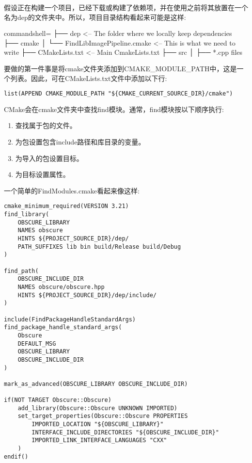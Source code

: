 假设正在构建一个项目，已经下载或构建了依赖项，并在使用之前将其放置在一个名为dep的文件夹中。所以，项目目录结构看起来可能是这样:

\begin{tcblisting}{commandshell={}}
├── dep <-- The folder where we locally keep dependencies
├── cmake
│     └── FindLibImagePipeline.cmake <-- This is what we need to write
├── CMakeLists.txt <-- Main CmakeLists.txt
├── src
│     ├── *.cpp files
\end{tcblisting}

要做的第一件事是将cmake文件夹添加到CMAKE\_MODULE\_PATH中，这是一个列表。因此，可在CMakeLists.txt文件中添加以下行:

\begin{lstlisting}[style=styleCMake]
list(APPEND CMAKE_MODULE_PATH "${CMAKE_CURRENT_SOURCE_DIR}/cmake")
\end{lstlisting}

CMake会在cmake文件夹中查找find模块。通常，find模块按以下顺序执行:

\begin{enumerate}
\item 
查找属于包的文件。
	
\item 
为包设置包含include路径和库目录的变量。

\item 
为导入的包设置目标。

\item 
为目标设置属性。
\end{enumerate}

一个简单的FindModules.cmake看起来像这样:

\begin{lstlisting}[style=styleCMake]
cmake_minimum_required(VERSION 3.21)
find_library(
	OBSCURE_LIBRARY
	NAMES obscure
	HINTS ${PROJECT_SOURCE_DIR}/dep/
	PATH_SUFFIXES lib bin build/Release build/Debug
)

find_path(
	OBSCURE_INCLUDE_DIR
	NAMES obscure/obscure.hpp
	HINTS ${PROJECT_SOURCE_DIR}/dep/include/
)

include(FindPackageHandleStandardArgs)
find_package_handle_standard_args(
	Obscure
	DEFAULT_MSG
	OBSCURE_LIBRARY
	OBSCURE_INCLUDE_DIR
)

mark_as_advanced(OBSCURE_LIBRARY OBSCURE_INCLUDE_DIR)

if(NOT TARGET Obscure::Obscure)
	add_library(Obscure::Obscure UNKNOWN IMPORTED)
	set_target_properties(Obscure::Obscure PROPERTIES
		IMPORTED_LOCATION "${OBSCURE_LIBRARY}"
		INTERFACE_INCLUDE_DIRECTORIES "${OBSCURE_INCLUDE_DIR}"
		IMPORTED_LINK_INTERFACE_LANGUAGES "CXX"
	)
endif()
\end{lstlisting}

